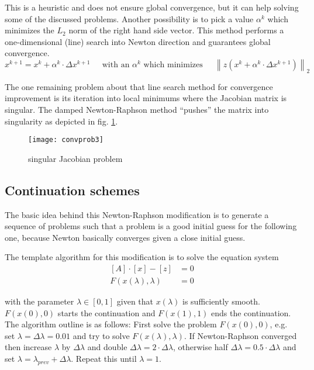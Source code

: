 This is a heuristic and does not ensure global convergence, but it can
help solving some of the discussed problems.  Another possibility is
to pick a value $\alpha^k$ which minimizes the $L_2$ norm of the right
hand side vector.  This method performs a one-dimensional (line)
search into Newton direction and guarantees global convergence.
\begin{equation}
x^{k+1} = x^k + \alpha^k \cdot \Delta x^{k+1}
\;\;\;\; \textrm{ with an } \alpha^k \textrm{ which minimizes } \;\;\;\;
\left\lVert z\left(x^k + \alpha^k \cdot \Delta x^{k+1}\right)\right\rVert_2
\end{equation}

The one remaining problem about that line search method for
convergence improvement is its iteration into local minimums where the
Jacobian matrix is singular.  The damped Newton-Raphson method
``pushes'' the matrix into singularity as depicted in
fig. \ref{fig:ConvProb3}.
\begin{figure}[ht]
\centering
\texttt{[image: convprob3]}
\caption{singular Jacobian problem}
\label{fig:ConvProb3}
\end{figure}
\FloatBarrier

\subsection{Continuation schemes}
\label{sec:continuation}

The basic idea behind this Newton-Raphson modification is to generate
a sequence of problems such that a problem is a good initial guess for
the following one, because Newton basically converges given a close
initial guess.

\addvspace{12pt}

The template algorithm for this modification is to solve the equation
system
\begin{align}
\left[A\right] \cdot \left[x\right] - \left[z\right] &= 0\\
F\left(x\left(\lambda\right), \lambda\right) &= 0
\end{align}

with the parameter $\lambda \in [0,1]$ given that
$x\left(\lambda\right)$ is sufficiently smooth.
$F\left(x\left(0\right), 0\right)$ starts the continuation and
$F\left(x\left(1\right), 1\right)$ ends the continuation.  The
algorithm outline is as follows: First solve the problem
$F\left(x\left(0\right), 0\right)$, e.g. set $\lambda = \Delta\lambda
= 0.01$ and try to solve $F\left(x\left(\lambda\right),
\lambda\right)$.  If Newton-Raphson converged then increase $\lambda$
by $\Delta\lambda$ and double $\Delta\lambda = 2\cdot \Delta\lambda$,
otherwise half $\Delta\lambda = 0.5\cdot \Delta\lambda$ and set
$\lambda = \lambda_{prev} + \Delta\lambda$.  Repeat this until
$\lambda = 1$.

